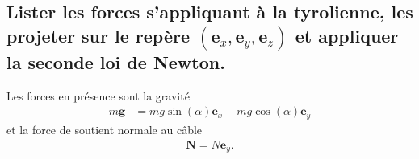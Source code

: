 \documentclass[11pt,a4paper]{exam}
\newcommand{\exACDH}{\bm e_x}
\newcommand{\eyACDH}{\bm e_y}
\newcommand{\ezACDH}{\bm e_z}
\begin{document}
\begin{parts}
\part{Lister les forces s'appliquant à la tyrolienne, les projeter sur le repère $(\exACDH, \eyACDH, \ezACDH)$ et appliquer la seconde loi de Newton.}
    \par\vspace{2mm}
    Les forces en présence sont la gravité
    \begin{align}
        m\bm g &= mg\sin(\alpha) \exACDH - mg\cos(\alpha) \eyACDH
    \end{align}
    et la force de soutient normale au câble
    \begin{align}
        \bm N  = N \bm e_y.
    \end{align}
    

\end{parts}
\end{document}
